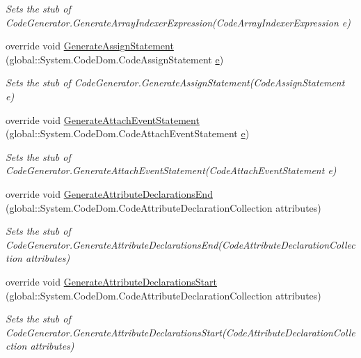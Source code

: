 \begin{DoxyCompactItemize}
\begin{DoxyCompactList}\small\item\em Sets the stub of Code\-Generator.\-Generate\-Array\-Indexer\-Expression(\-Code\-Array\-Indexer\-Expression e)\end{DoxyCompactList}\item 
override void \hyperlink{class_system_1_1_code_dom_1_1_compiler_1_1_fakes_1_1_stub_code_compiler_a049f14dff27adec15bb3c010ad79ff03}{Generate\-Assign\-Statement} (global\-::\-System.\-Code\-Dom.\-Code\-Assign\-Statement \hyperlink{jquery-1_810_82_8min_8js_a2c038346d47955cbe2cb91e338edd7e1}{e})
\begin{DoxyCompactList}\small\item\em Sets the stub of Code\-Generator.\-Generate\-Assign\-Statement(\-Code\-Assign\-Statement e)\end{DoxyCompactList}\item 
override void \hyperlink{class_system_1_1_code_dom_1_1_compiler_1_1_fakes_1_1_stub_code_compiler_a20e24e5335790148258344055d1b6af3}{Generate\-Attach\-Event\-Statement} (global\-::\-System.\-Code\-Dom.\-Code\-Attach\-Event\-Statement \hyperlink{jquery-1_810_82_8min_8js_a2c038346d47955cbe2cb91e338edd7e1}{e})
\begin{DoxyCompactList}\small\item\em Sets the stub of Code\-Generator.\-Generate\-Attach\-Event\-Statement(\-Code\-Attach\-Event\-Statement e)\end{DoxyCompactList}\item 
override void \hyperlink{class_system_1_1_code_dom_1_1_compiler_1_1_fakes_1_1_stub_code_compiler_a84225f4eac4770458ab9ce811d92afd2}{Generate\-Attribute\-Declarations\-End} (global\-::\-System.\-Code\-Dom.\-Code\-Attribute\-Declaration\-Collection attributes)
\begin{DoxyCompactList}\small\item\em Sets the stub of Code\-Generator.\-Generate\-Attribute\-Declarations\-End(\-Code\-Attribute\-Declaration\-Collection attributes)\end{DoxyCompactList}\item 
override void \hyperlink{class_system_1_1_code_dom_1_1_compiler_1_1_fakes_1_1_stub_code_compiler_af5bfbb716974c836b9c6365c7997f68e}{Generate\-Attribute\-Declarations\-Start} (global\-::\-System.\-Code\-Dom.\-Code\-Attribute\-Declaration\-Collection attributes)
\begin{DoxyCompactList}\small\item\em Sets the stub of Code\-Generator.\-Generate\-Attribute\-Declarations\-Start(\-Code\-Attribute\-Declaration\-Collection attributes)\end{DoxyCompactList}\item 

\end{DoxyCompactItemize}
